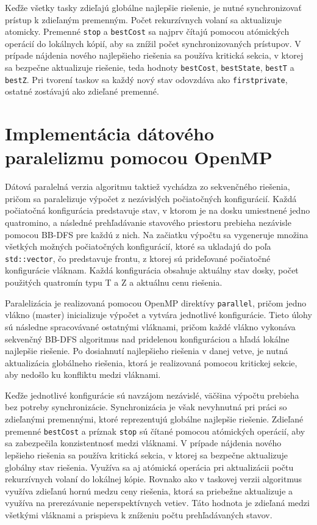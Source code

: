 \documentclass[a4paper]{article}
\begin{document}
Keďže všetky tasky zdieľajú globálne najlepšie riešenie, je nutné synchronizovať prístup k zdieľaným premenným. Počet rekurzívnych volaní sa aktualizuje atomicky. Premenné \texttt{stop} a \texttt{bestCost} sa najprv čítajú pomocou atómických operácií do lokálnych kópií, aby sa znížil počet synchronizovaných prístupov. 
V prípade nájdenia nového najlepšieho riešenia sa používa kritická sekcia, v ktorej sa bezpečne aktualizuje riešenie, teda hodnoty \texttt{bestCost}, \texttt{bestState}, \texttt{bestT} a \texttt{bestZ}.
Pri tvorení taskov sa každý nový stav odovzdáva ako \texttt{firstprivate}, ostatné zostávajú ako zdieľané premenné. 

\section{Implementácia dátového paralelizmu pomocou OpenMP}

Dátová paralelná verzia algoritmu taktiež vychádza zo sekvenčného riešenia, pričom sa paralelizuje výpočet z nezávislých počiatočných konfigurácií. 
Každá počiatočná konfigurácia predstavuje stav, v ktorom je na dosku umiestnené jedno quatromino, a následné prehľadávanie stavového priestoru prebieha nezávisle pomocou BB-DFS pre každú z nich.
Na začiatku výpočtu sa vygeneruje množina všetkých možných počiatočných konfigurácií, ktoré sa ukladajú do poľa \texttt{std::vector}, čo predstavuje frontu, z ktorej sú prideľované počiatočné konfigurácie vláknam. Každá konfigurácia obsahuje aktuálny stav dosky, počet použitých quatromín typu T a Z a aktuálnu cenu riešenia.

Paralelizácia je realizovaná pomocou OpenMP direktívy \texttt{parallel}, pričom jedno vlákno (master) inicializuje výpočet a vytvára jednotlivé konfigurácie. Tieto úlohy sú následne spracovávané ostatnými vláknami, pričom každé vlákno vykonáva sekvenčný BB-DFS algoritmus nad pridelenou konfiguráciou a hľadá lokálne najlepšie riešenie. 
Po dosiahnutí najlepšieho riešenia v danej vetve, je nutná aktualizácia globálneho riešenia, ktorá je realizovaná pomocou kritickej sekcie, aby nedošlo ku konfliktu medzi vláknami.

Keďže jednotlivé konfigurácie sú navzájom nezávislé, väčšina výpočtu prebieha bez potreby synchronizácie. Synchronizácia je však nevyhnutná pri práci so zdieľanými premennými, ktoré reprezentujú globálne najlepšie riešenie. 
Zdieľané premenné \texttt{bestCost} a príznak \texttt{stop} sú čítané pomocou atómických operácií, aby sa zabezpečila konzistentnosť medzi vláknami. 
V prípade nájdenia nového lepšieho riešenia sa používa kritická sekcia, v ktorej sa bezpečne aktualizuje globálny stav riešenia. Využíva sa aj atómická operácia pri aktualizácii počtu rekurzívnych volaní do lokálnej kópie.
Rovnako ako v taskovej verzii algoritmus využíva zdieľanú hornú medzu ceny riešenia, ktorá sa priebežne aktualizuje a využíva na prerezávanie neperspektívnych vetiev. Táto hodnota je zdieľaná medzi všetkými vláknami a prispieva k zníženiu počtu prehľadávaných stavov.
\end{document}
